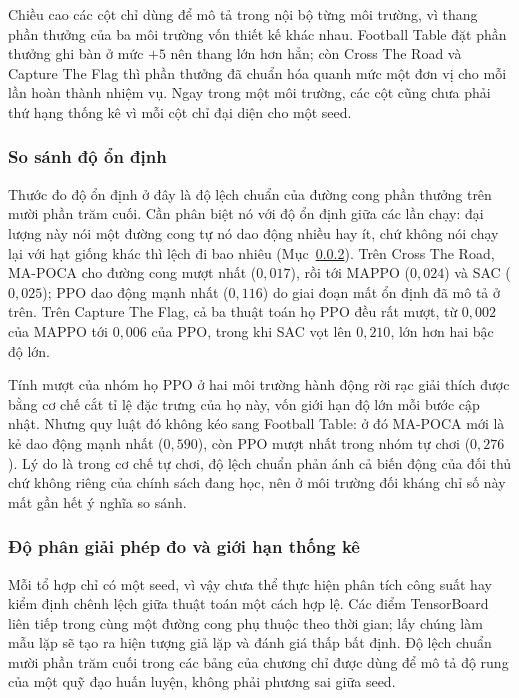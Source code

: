 \indent Chiều cao các cột chỉ dùng để mô tả trong nội bộ từng môi trường, vì thang phần
thưởng của ba môi trường vốn thiết kế khác nhau. Football Table đặt phần thưởng ghi bàn ở
mức $+5$ nên thang lớn hơn hẳn; còn Cross The Road và Capture The Flag thì phần thưởng
đã chuẩn hóa quanh mức một đơn vị cho mỗi lần hoàn thành nhiệm vụ. Ngay trong một môi
trường, các cột cũng chưa phải thứ hạng thống kê vì mỗi cột chỉ đại diện cho một seed.

\subsubsection{So sánh độ ổn định}
\label{sub:stability}
\indent Thước đo độ ổn định ở đây là độ lệch chuẩn của đường cong phần thưởng trên mười
phần trăm cuối. Cần phân biệt nó với độ ổn định giữa các lần chạy: đại lượng này nói một
đường cong tự nó dao động nhiều hay ít, chứ không nói chạy lại với hạt giống khác thì lệch
đi bao nhiêu (Mục~\ref{sub:power}). Trên Cross The Road, MA-POCA cho đường cong mượt nhất ($0{,}017$), rồi tới
MAPPO ($0{,}024$) và SAC ($0{,}025$); PPO dao động mạnh nhất ($0{,}116$) do giai đoạn mất
ổn định đã mô tả ở trên. Trên Capture The Flag, cả ba thuật toán họ PPO đều rất mượt, từ
$0{,}002$ của MAPPO tới $0{,}006$ của PPO, trong khi SAC vọt lên $0{,}210$, lớn hơn hai bậc độ lớn.

\indent Tính mượt của nhóm họ PPO ở hai môi trường hành động rời rạc giải thích được bằng
cơ chế cắt tỉ lệ đặc trưng của họ này, vốn giới hạn độ lớn mỗi bước cập nhật. Nhưng quy
luật đó không kéo sang Football Table: ở đó MA-POCA mới là kẻ dao động mạnh nhất
($0{,}590$), còn PPO mượt nhất trong nhóm tự chơi ($0{,}276$). Lý do là trong cơ chế tự
chơi, độ lệch chuẩn phản ánh cả biến động của đối thủ chứ không riêng của chính sách đang
học, nên ở môi trường đối kháng chỉ số này mất gần hết ý nghĩa so sánh.

\subsubsection{Độ phân giải phép đo và giới hạn thống kê}
\label{sub:power}
\indent Mỗi tổ hợp chỉ có một seed, vì vậy chưa thể thực hiện phân tích công suất hay kiểm
định chênh lệch giữa thuật toán một cách hợp lệ. Các điểm TensorBoard liên tiếp trong cùng
một đường cong phụ thuộc theo thời gian; lấy chúng làm mẫu lặp sẽ tạo ra hiện tượng giả lặp
và đánh giá thấp bất định. Độ lệch chuẩn mười phần trăm cuối trong các bảng của chương chỉ
được dùng để mô tả độ rung của một quỹ đạo huấn luyện, không phải phương sai giữa seed.

